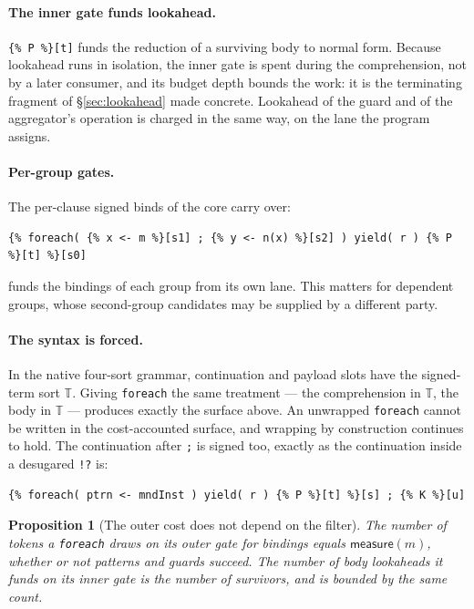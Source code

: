 \documentclass[11pt]{article}
\theoremstyle{branddef}
\theoremstyle{brandplain}
\newtheorem{proposition}[definition]{Proposition}
\theoremstyle{brandrem}
\newcommand{\T}{\mathbb{T}}
\newcommand{\meas}{\mathsf{measure}}
\newcommand{\fe}{\texttt{foreach}}
\begin{document}
\paragraph{The inner gate funds lookahead.} \verb|{% P %}[t]| funds the
reduction of a surviving body to normal form. Because lookahead runs in
isolation, the inner gate is spent during the comprehension, not by a later
consumer, and its budget depth bounds the work: it is the terminating fragment
of \S\ref{sec:lookahead} made concrete. Lookahead of the guard and of the
aggregator's operation is charged in the same way, on the lane the program
assigns.

\paragraph{Per-group gates.} The per-clause signed binds of the core carry over:
\begin{lstlisting}
{% foreach( {% x <- m %}[s1] ; {% y <- n(x) %}[s2] ) yield( r ) {% P %}[t] %}[s0]
\end{lstlisting}
funds the bindings of each group from its own lane. This matters for dependent
groups, whose second-group candidates may be supplied by a different party.

\paragraph{The syntax is forced.} In the native four-sort grammar, continuation
and payload slots have the signed-term sort \(\T\). Giving \fe{} the same
treatment --- the comprehension in \(\T\), the body in \(\T\) --- produces
exactly the surface above. An unwrapped \fe{} cannot be written in the
cost-accounted surface, and wrapping by construction continues to hold. The
continuation after \texttt{;} is signed too, exactly as the continuation inside
a desugared \verb|!?| is:
\begin{lstlisting}
{% foreach( ptrn <- mndInst ) yield( r ) {% P %}[t] %}[s] ; {% K %}[u]
\end{lstlisting}

\begin{proposition}[The outer cost does not depend on the filter]
\label{prop:filterindep}
The number of tokens a \fe{} draws on its outer gate for bindings equals
\(\meas(m)\), whether or not patterns and guards succeed. The number of body
lookaheads it funds on its inner gate is the number of survivors, and is bounded
by the same count.
\end{proposition}
\end{document}
